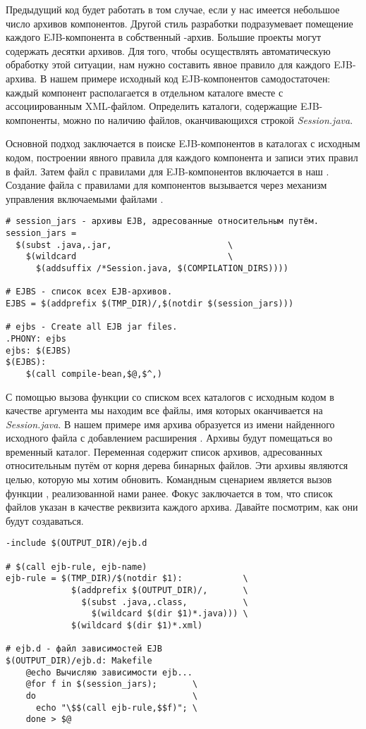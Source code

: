 Предыдущий код будет работать в том случае, если у нас имеется
небольшое число архивов компонентов. Другой стиль разработки
подразумевает помещение каждого EJB\hyp{}компонента в собственный
\Java{}\hyp{}архив. Большие проекты могут содержать десятки архивов.
Для того, чтобы осуществлять автоматическую обработку этой ситуации,
нам нужно составить явное правило для каждого EJB\hyp{}архива. В нашем
примере исходный код EJB\hyp{}компонентов самодостаточен: каждый
компонент располагается в отдельном каталоге вместе с ассоциированным
XML\hyp{}файлом. Определить каталоги, содержащие EJB\hyp{}компоненты,
можно по наличию файлов, оканчивающихся строкой \emph{Session.java}.

Основной подход заключается в поиске EJB\hyp{}компонентов в каталогах
с исходным кодом, построении явного правила для каждого компонента и
записи этих правил в файл. Затем файл с правилами для
EJB\hyp{}компонентов включается в наш \Makefile{}. Создание файла с
правилами для компонентов вызывается через механизм управления
включаемыми файлами \GNUmake{}.

{\footnotesize
\begin{verbatim}
# session_jars - архивы EJB, адресованные относительным путём.
session_jars =
  $(subst .java,.jar,                       \
    $(wildcard                              \
      $(addsuffix /*Session.java, $(COMPILATION_DIRS))))

# EJBS - список всех EJB-архивов.
EJBS = $(addprefix $(TMP_DIR)/,$(notdir $(session_jars)))

# ejbs - Create all EJB jar files.
.PHONY: ejbs
ejbs: $(EJBS)
$(EJBS):
    $(call compile-bean,$@,$^,)
\end{verbatim}
}

С помощью вызова функции  со списком всех
каталогов с исходным кодом в качестве аргумента мы находим все файлы,
имя которых оканчивается на \emph{Session.java}. В нашем примере имя
архива образуется из имени найденного исходного файла с добавлением
расширения \filename{.jar}. Архивы будут помещаться во временный
каталог. Переменная \variable{EJBS} содержит список архивов,
адресованных относительным путём от корня дерева бинарных файлов.
Эти архивы являются целью, которую мы хотим обновить. Командным
сценарием является вызов функции \function{compile\hyp{}bean},
реализованной нами ранее. Фокус заключается в том, что список файлов
указан в качестве реквизита каждого архива. Давайте посмотрим, как
они будут создаваться.

{\footnotesize
\begin{verbatim}
-include $(OUTPUT_DIR)/ejb.d

# $(call ejb-rule, ejb-name)
ejb-rule = $(TMP_DIR)/$(notdir $1):            \
             $(addprefix $(OUTPUT_DIR)/,       \
               $(subst .java,.class,           \
                 $(wildcard $(dir $1)*.java))) \
             $(wildcard $(dir $1)*.xml)

# ejb.d - файл зависимостей EJB
$(OUTPUT_DIR)/ejb.d: Makefile
    @echo Вычисляю зависимости ejb...
    @for f in $(session_jars);       \
    do                               \
      echo "\$$(call ejb-rule,$$f)"; \
    done > $@
\end{verbatim}
}

